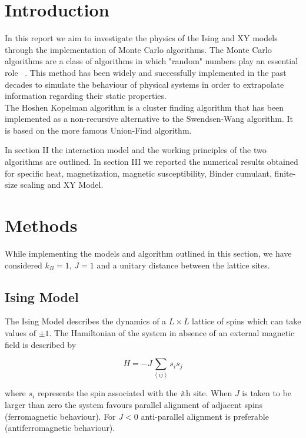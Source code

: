 \documentclass[twoside]{article}
\def\mean#1{\left< #1 \right>}
\begin{document}
\begin{multicols}{2} %

\section{Introduction}
In this report we aim to investigate the physics of the Ising and XY models through the implementation of Monte Carlo algorithms.
The Monte Carlo algorithms are a class of algorithms in which "random" numbers play an essential role ~\cite{thijssen}. This method has been widely and successfully implemented in the past decades to simulate the behaviour of physical systems in order to extrapolate information regarding their static properties. \\
The Hoshen Kopelman algorithm is a cluster finding algorithm that has been implemented as a non-recursive alternative to the Swendsen-Wang algorithm. It is based on the more famous Union-Find algorithm.

In section II the interaction model and the working principles of the two algorithms are outlined. In section III we reported the numerical results obtained for specific heat, magnetization, magnetic susceptibility, Binder cumulant, finite-size scaling and XY Model.



\section{Methods}
While implementing the models and algorithm outlined in this section, we have considered $k_B = 1$, $J = 1$ and a unitary distance between the lattice sites.

\subsection{Ising Model}
The Ising Model describes the dynamics of a $L \times L$ lattice of spins which can take values of $\pm 1$. The Hamiltonian of the system in absence of an external magnetic field is described by

\begin{equation}
\label{ising_hamiltonian}
H = - J \sum_{\mean{ij}} s_i s_j
\end{equation}

where $s_i$ represents the spin associated with the \emph{i}th site.
When $J$ is taken to be larger than zero the system favours parallel alignment of adjacent spins (ferromagnetic behaviour). For $J<0$ anti-parallel alignment is preferable (antiferromagnetic behaviour).


\end{multicols}
\end{document}
